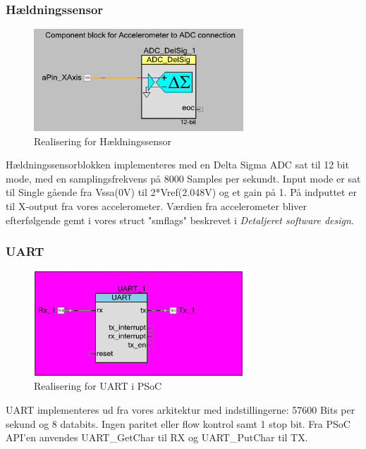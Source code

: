 \subsubsection{Hældningssensor}
\begin{figure}[H]
\centering
\includegraphics[width=0.7\textwidth]{billeder/levelsensor}
\caption{Realisering for Hældningssensor}
\label{fig:SMLEVEL}
\end{figure}
Hældningssensorblokken implementeres med en Delta Sigma ADC sat til 12 bit mode, med en samplingsfrekvens på 8000 Samples per sekundt. Input mode er sat til Single gående fra Vssa(0V) til 2*Vref(2.048V) og et gain på 1. På indputtet er til X-output fra vores accelerometer. Værdien fra accelerometer bliver efterfølgende gemt i vores struct "smflags" beskrevet i \textit{Detaljeret software design}.
\subsubsection{UART}
\begin{figure}[H]
\centering
\includegraphics[width=0.7\textwidth]{billeder/uartpsoc}
\caption{Realisering for UART i PSoC}
\label{fig:SMUARTR}
\end{figure}
UART implementeres ud fra vores arkitektur med indstillingerne: 57600 Bits per sekund og 8 databits. Ingen paritet eller flow kontrol samt 1 stop bit. Fra PSoC API'en anvendes UART_GetChar til RX og UART_PutChar til TX. 
